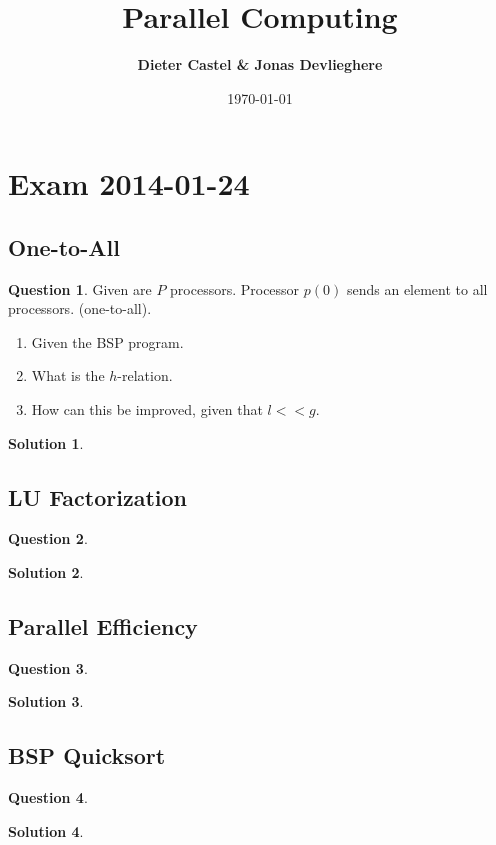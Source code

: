 \documentclass[a4paper, 10pt, oneside]{article}
\title{Parallel Computing}
\date{\today}
\author{\textbf{Dieter Castel \& Jonas Devlieghere}}
\theoremstyle{definition}
\newtheorem*{question}{Question}
\newtheorem*{solution}{Solution}
\begin{document}
\maketitle
\newpage

\tableofcontents
\newpage

\section{Exam 2014-01-24}

\subsection{One-to-All}
\begin{question}
Given are $P$ processors. Processor $p(0)$ sends an element to all processors. (one-to-all).
\begin{enumerate}
	\item Given the BSP program.
	\item What is the $h$-relation.
	\item How can this be improved, given that $l << g$.
\end{enumerate}
\end{question}
\begin{solution}
\end{solution}

\subsection{LU Factorization}
\begin{question}
\end{question}
\begin{solution}
\end{solution}

\subsection{Parallel Efficiency}
\begin{question}
\end{question}
\begin{solution}
\end{solution}

\subsection{BSP Quicksort}
\begin{question}
\end{question}
\begin{solution}
\end{solution}
\end{document}
